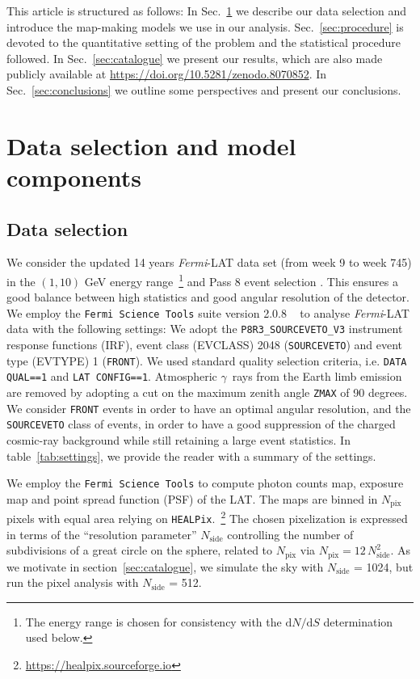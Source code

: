 \documentclass{article}
\def\dNdS{\textrm{d}N/\textrm{d}S}
\newcommand{\Fermi}{\textit{Fermi}}
\newcommand{\g}{$\gamma$}
\begin{document}
This article is structured as follows: In Sec.~\ref{sec:data} we describe our data selection and introduce the map-making models we  use in our analysis.  Sec.~\ref {sec:procedure} is devoted to the quantitative setting of the problem and the statistical procedure followed. In Sec.~\ref{sec:catalogue} we present our results, which are also  made publicly available at \href{https://doi.org/10.5281/zenodo.8070852}{https://doi.org/10.5281/zenodo.8070852}. In Sec.~\ref{sec:conclusions} we outline some perspectives and present our conclusions.  

\section{Data selection and model components}
\label{sec:data}
\subsection{Data selection}
We consider the updated 14 years \Fermi-LAT data set (from week 9 to week 745) in the $(1,10)$ GeV energy range~\footnote{The energy range is chosen for consistency with the $\dNdS$ determination used below.} and Pass 8 event selection \cite{Fermi-LAT:2013jgq,Bruel:2018lac}. This ensures a good balance between high statistics and good angular resolution of the detector. We employ the \texttt{Fermi Science Tools} suite version 2.0.8 ~\cite{Fermitools} to analyse \Fermi-LAT data with the following settings: 
We adopt the \verb|P8R3_SOURCEVETO_V3| instrument response functions (IRF), event class (EVCLASS) 2048 (\texttt{SOURCEVETO}) and event type (EVTYPE) 1 (\verb|FRONT|). We used standard quality selection criteria, i.e. \verb|DATA QUAL==1| and \verb|LAT CONFIG==1|.
Atmospheric \g~rays from the Earth limb emission are removed by adopting a cut on the maximum zenith angle \texttt{ZMAX} of 90 degrees. We consider \verb|FRONT| events in order to have an optimal angular resolution, and the \texttt{SOURCEVETO} class of events, in order to have a good suppression of the charged cosmic-ray background while still retaining a large event statistics. 
In table~\ref{tab:settings}, we provide the reader with  a summary of the settings.
%

We employ the \texttt{Fermi Science Tools} to compute photon counts map, exposure map and point spread function (PSF) of the LAT.
%
The maps are binned in $N_\textrm{pix}$ pixels with equal area  relying on \texttt{HEALPix}.~\footnote{\href{https://healpix.sourceforge.io}{https://healpix.sourceforge.io}} The chosen pixelization is expressed in terms of the ``resolution parameter'' $N_\textrm{side}$ controlling the number of subdivisions of a great circle on the sphere, related to $N_\textrm{pix}$ via $N_\textrm{pix}=12 \, N_\textrm{side}^2$. 
%
As we  motivate in section~\ref{sec:catalogue}, we simulate the sky
with $N_\textrm{side}$ = 1024, but run the pixel analysis with $N_\textrm{side}$ = 512. 
%
\end{document}
